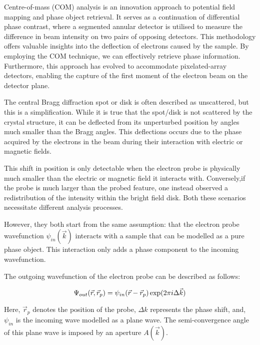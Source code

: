 Centre-of-mass (COM) analysis is an innovation approach to potential field mapping and phase object retrieval. 
%
It serves as a continuation of differential phase contrast, where a segmented annular detector is utilised to measure the difference in beam intensity on two pairs of opposing detectors. 
%
This methodology offers valuable insights into the deflection of electrons caused by the sample. 
%
By employing the COM technique, we can effectively  retrieve phase information. 
%
Furthermore, this approach has evolved to accommodate pixelated-array detectors, enabling the capture of the first moment of the electron beam on the detector plane. 

The central Bragg diffraction spot or disk is often described as unscattered, but this is a simplification. 
%
While it is true that the spot/disk is not scattered by the crystal structure, it can be deflected from its  unperturbed position by angles much smaller than the Bragg angles. 
%
This deflections occurs due to the phase acquired by the electrons in the beam during their interaction with electric or magnetic fields.

This shift in position is only detectable when the electron probe is physically much smaller than the electric or magnetic field it interacts with.
%
Conversely,if the probe is much larger than the probed feature, one instead observed a redistribution of the intensity within the bright field disk.
%
Both these scenarios necessitate different analysis processes.

However, they both start from the same assumption: that the electron probe wavefunction $\psi_{in}(\vec{k})$ interacts with a sample that can be modelled as a pure phase object. This interaction only adds a phase component to the incoming wavefunction\cite{caoTheoryPracticeElectron2018, lazicPhaseContrastSTEM2016}. 

The outgoing wavefunction of the electron probe can be described as follows:

\begin{equation}
    \Psi_{out}(\vec{r},\vec{r}_p)=\psi_{in}(\vec{r}-\vec{r}_p)\exp(2\pi i \Delta \vec{k})\\
    \label{eq:out_wav}
\end{equation}

Here, $\vec{r}_p$ denotes the position of the probe, $\Delta k$ represents the phase shift, and, $\psi_{in}$ is the incoming wave modelled as a plane wave. The semi-convergence angle of this plane wave is imposed by an aperture $A(\vec{k})$.

